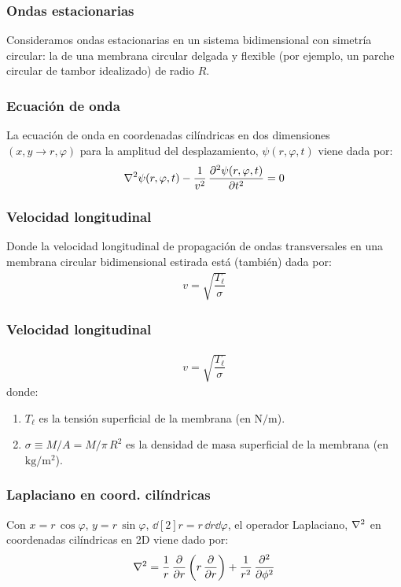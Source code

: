 \documentclass[12pt]{beamer}
\begin{document}
\begin{frame}
\frametitle{Ondas estacionarias}
Consideramos ondas estacionarias en un sistema bidimensional con simetría circular: \pause la de una membrana circular delgada y flexible (por ejemplo, un parche circular de tambor idealizado) de radio $R$.
\end{frame}
\begin{frame}
\frametitle{Ecuación de onda}
La ecuación de onda en coordenadas cilíndricas en dos dimensiones $(x , y \to r, \varphi)$ para la amplitud del desplazamiento, $\psi (r, \varphi, t)$ viene dada por:
\pause
\begin{align*}
\laplacian{\psi} (r, \varphi, t) - \dfrac{1}{v^{2}} \, \pdv[2]{\psi (r, \varphi, t)}{t} = 0
\end{align*}
\end{frame}
\begin{frame}
\frametitle{Velocidad longitudinal}
Donde la velocidad longitudinal de propagación de ondas transversales en una membrana circular bidimensional estirada está (también) dada por:
\pause
\begin{align*}
v = \sqrt{\dfrac{T_{\ell}}{\sigma}}
\end{align*}
\end{frame}
\begin{frame}
\frametitle{Velocidad longitudinal}
\begin{align*}
v = \sqrt{\dfrac{T_{\ell}}{\sigma}}
\end{align*}
donde:
\begin{enumerate}[<+->]
\item $T_{\ell}$ es la tensión superficial de la membrana (en $\si{\newton\per\metre}$).
\item $\sigma \equiv M/A = M / \pi \, R^{2}$ es la densidad de masa superficial de la membrana (en $\si{\kilo\gram\per\square\metre}$).
\end{enumerate}
\end{frame}
\begin{frame}
\frametitle{Laplaciano en coord. cilíndricas}
Con $x = r \, \cos \varphi$, $y = r \, \sin \varphi$, $\dd[2]{r} = r \, \dd{r} \dd{\varphi}$, \pause el operador Laplaciano, $\laplacian$ en coordenadas cilíndricas en 2D viene dado por:
\pause
\begin{align*}
\laplacian = \dfrac{1}{r} \, \pdv{r} \left( r \, \pdv{r} \right) + \dfrac{1}{r^{2}} \, \pdv[2]{\phi}
\end{align*}
\end{frame}
\end{document}
